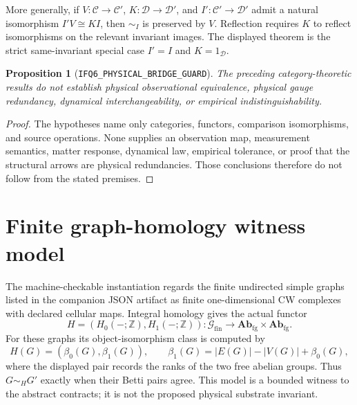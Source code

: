 \documentclass[11pt]{article}
\newtheorem{proposition}{Proposition}
\newcommand{\EqI}{\mathrel{\sim_I}}
\begin{document}
More generally, if \(V:\mathcal C\to\mathcal C'\),
\(K:\mathcal D\to\mathcal D'\), and
\(I':\mathcal C'\to\mathcal D'\) admit a natural isomorphism
\(I'V\cong KI\), then \(\EqI\) is preserved by \(V\).  Reflection requires
\(K\) to reflect isomorphisms on the relevant invariant images.  The displayed
theorem is the strict same-invariant special case \(I'=I\) and
\(K=1_{\mathcal D}\).

\begin{proposition}[\texttt{IFQ6\_PHYSICAL\_BRIDGE\_GUARD}]
The preceding category-theoretic results do not establish physical
observational equivalence, physical gauge redundancy, dynamical
interchangeability, or empirical indistinguishability.
\end{proposition}
\begin{proof}
The hypotheses name only categories, functors, comparison isomorphisms, and
source operations.  None supplies an observation map, measurement semantics,
matter response, dynamical law, empirical tolerance, or proof that the
structural arrows are physical redundancies.  Those conclusions therefore do
not follow from the stated premises.
\end{proof}

\section{Finite graph-homology witness model}

The machine-checkable instantiation regards the finite undirected simple graphs
listed in the companion JSON artifact as finite one-dimensional CW complexes
with declared cellular maps.  Integral homology gives the actual functor
\[
  H=(H_0(-;\mathbb Z),H_1(-;\mathbb Z)):
  \mathcal G_{\mathrm{fin}}\longrightarrow
  \mathbf{Ab}_{\mathrm{fg}}\times\mathbf{Ab}_{\mathrm{fg}}.
\]
For these graphs its object-isomorphism class is computed by
\[
 H(G)=(\beta_0(G),\beta_1(G)),\qquad
 \beta_1(G)=|E(G)|-|V(G)|+\beta_0(G),
\]
where the displayed pair records the ranks of the two free abelian groups.
Thus \(G\sim_HG'\) exactly when their Betti pairs agree.  This model is a
bounded witness to the abstract contracts; it is not the proposed physical
substrate invariant.
\end{document}
